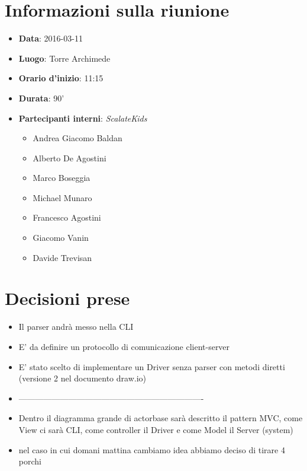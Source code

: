 \documentclass{scalatekids-article}
\begin{document}
\section{Informazioni sulla riunione}
\begin{itemize}
\item \textbf{Data}: 2016-03-11
\item \textbf{Luogo}: Torre Archimede
\item \textbf{Orario d'inizio}: 11:15
\item \textbf{Durata}: 90'
\item \textbf{Partecipanti interni}: \textit{ScalateKids}
  \begin{itemize}
  \item Andrea Giacomo Baldan 
  \item Alberto De Agostini
  \item Marco Boseggia
  \item Michael Munaro
  \item Francesco Agostini
  \item Giacomo Vanin
  \item Davide Trevisan
  \end{itemize}
\end{itemize}
\section{Decisioni prese}
\begin{itemize}
  \item Il parser andrà messo nella CLI
  \item E' da definire un protocollo di comunicazione client-server
  \item E' stato scelto di implementare un Driver senza parser con metodi diretti (versione 2 nel documento draw.io)%
  \item -------------------------------------------------------------------
  \item Dentro il diagramma grande di actorbase sarà descritto il pattern MVC, come View ci sarà CLI, come controller il Driver e come Model il Server (system)
  \item nel caso in cui domani mattina cambiamo idea abbiamo deciso di tirare 4 porchi
\end{itemize}
\end{document}

